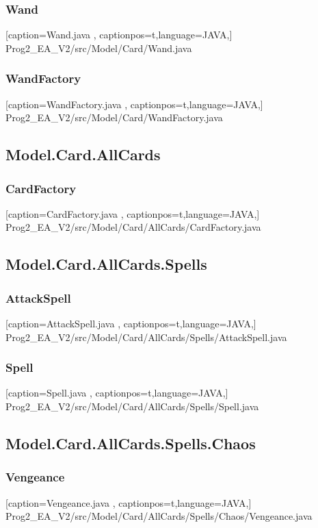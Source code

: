\documentclass[a4paper,12pt]{scrartcl}
\begin{document}
	\subsubsection{Wand}
	
	[caption={Wand.java}
	\label{lst:javaclass},
	captionpos=t,language=JAVA,]
	{Prog2_EA_V2/src/Model/Card/Wand.java}
	\subsubsection{WandFactory}
	
	[caption={WandFactory.java}
	\label{lst:javaclass},
	captionpos=t,language=JAVA,]
	{Prog2_EA_V2/src/Model/Card/WandFactory.java}
	\subsection{Model.Card.AllCards}
	\subsubsection{CardFactory}
	
	[caption={CardFactory.java}
	\label{lst:javaclass},
	captionpos=t,language=JAVA,]
	{Prog2_EA_V2/src/Model/Card/AllCards/CardFactory.java}
	\subsection{Model.Card.AllCards.Spells}
	\subsubsection{AttackSpell}
	
	[caption={AttackSpell.java}
	\label{lst:javaclass},
	captionpos=t,language=JAVA,]
	{Prog2_EA_V2/src/Model/Card/AllCards/Spells/AttackSpell.java}
	\subsubsection{Spell}
	
	[caption={Spell.java}
	\label{lst:javaclass},
	captionpos=t,language=JAVA,]
	{Prog2_EA_V2/src/Model/Card/AllCards/Spells/Spell.java}
	\subsection{Model.Card.AllCards.Spells.Chaos}
	\subsubsection{Vengeance}
	
	[caption={Vengeance.java}
	\label{lst:javaclass},
	captionpos=t,language=JAVA,]
	{Prog2_EA_V2/src/Model/Card/AllCards/Spells/Chaos/Vengeance.java}
\end{document}

